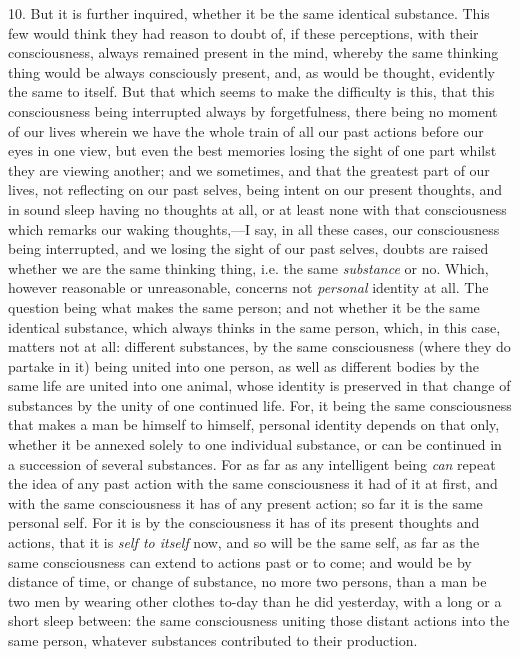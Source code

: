 10. But it is further inquired, whether it be the same identical
substance. This few would think they had reason to doubt of, if these
perceptions, with their consciousness, always remained present in the
mind, whereby the same thinking thing would be always consciously
present, and, as would be thought, evidently the same to itself. But
that which seems to make the difficulty is this, that this
consciousness being interrupted always by forgetfulness, there being
no moment of our lives wherein we have the whole train of all our past
actions before our eyes in one view, but even the best memories losing
the sight of one part whilst they are viewing another; and we
sometimes, and that the greatest part of our lives, not reflecting on
our past selves, being intent on our present thoughts, and in sound
sleep having no thoughts at all, or at least none with that
consciousness which remarks our waking thoughts,---I say, in all these
cases, our consciousness being interrupted, and we losing the sight of
our past selves, doubts are raised whether we are the same thinking
thing, i.e. the same \textit{substance} or no. Which, however
reasonable or unreasonable, concerns not \textit{personal} identity at
all. The question being what makes the same person; and not whether it
be the same identical substance, which always thinks in the same
person, which, in this case, matters not at all: different substances,
by the same consciousness (where they do partake in it) being united
into one person, as well as different bodies by the same life are
united into one animal, whose identity is preserved in that change of
substances by the unity of one continued life. For, it being the
 same consciousness that makes a man be himself to himself,
personal identity depends on that only, whether it be annexed solely
to one individual substance, or can be continued in a succession of
several substances. For as far as any intelligent being \textit{can}
repeat the idea of any past action with the same consciousness it had
of it at first, and with the same consciousness it has of any present
action; so far it is the same personal self. For it is by the
consciousness it has of its present thoughts and actions, that it is
\textit{self to itself} now, and so will be the same self, as far as
the same consciousness can extend to actions past or to come; and
would be by distance of time, or change of substance, no more two
persons, than a man be two men by wearing other clothes to-day than he
did yesterday, with a long or a short sleep between: the same
consciousness uniting those distant  actions into the same
person, whatever substances contributed to their production.

